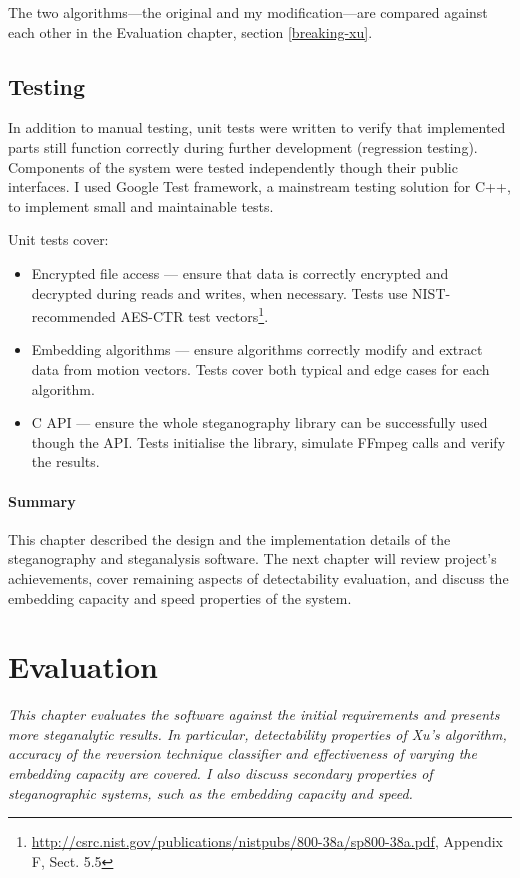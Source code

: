 \documentclass[12pt,british,twoside,notitlepage,usenames,dvipsnames,hypens,final]{report}
\numberwithin{equation}{section}
\numberwithin{figure}{section}
\begin{document}
The two algorithms---the original and my modification---are compared against each other in the Evaluation chapter, section \ref{breaking-xu}.

\section{Testing}

In addition to manual testing, unit tests were written to verify that implemented parts still function correctly during further development (regression testing). Components of the system were tested independently though their public interfaces. I used Google Test framework, a mainstream testing solution for C++, to implement small and maintainable tests.

Unit tests cover:
\begin{itemize}
\item Encrypted file access --- ensure that data is correctly encrypted and decrypted during reads and writes, when necessary. Tests use NIST-recommended AES-CTR test vectors\footnote{\url{http://csrc.nist.gov/publications/nistpubs/800-38a/sp800-38a.pdf}, Appendix F, Sect. 5.5}.
\item Embedding algorithms --- ensure algorithms correctly modify and extract data from motion vectors. Tests cover both typical and edge cases for each algorithm.
\item C API --- ensure the whole steganography library can be successfully used though the API. Tests initialise the library, simulate FFmpeg calls and verify the results. 
\end{itemize}

\bigskip\bigskip
\subsubsection*{Summary}
This chapter described the design and the implementation details of the steganography and steganalysis software. The next chapter will review project's achievements, cover remaining aspects of detectability evaluation, and discuss the embedding capacity and speed properties of the system. 

\cleardoublepage
\chapter{Evaluation}

\textit{This chapter evaluates the software against the initial requirements and presents more steganalytic results. In particular, detectability properties of Xu's algorithm, accuracy of the reversion technique classifier and effectiveness of varying the embedding capacity are covered. I also discuss secondary properties of steganographic systems, such as the embedding capacity and speed.
}
\end{document}
